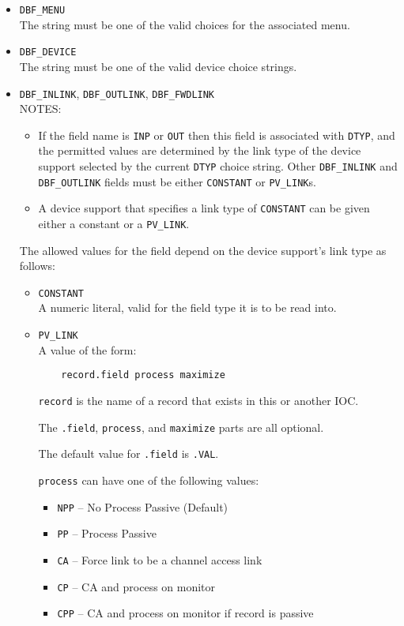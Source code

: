 \begin{description}
\begin{itemize}
\item \verb|DBF_MENU| \\
The string must be one of the valid choices for the associated menu.

\item \verb|DBF_DEVICE| \\
The string must be one of the valid device choice strings.

\item \verb|DBF_INLINK|, \verb|DBF_OUTLINK|, \verb|DBF_FWDLINK| \\
NOTES:

\begin{itemize}
\item If the field name is \verb|INP| or \verb|OUT| then this field is associated with \verb|DTYP|, and the permitted values
are determined by the link type of the device support selected by the current \verb|DTYP| choice string.
Other \verb|DBF_INLINK| and \verb|DBF_OUTLINK| fields must be either \verb|CONSTANT| or \verb|PV_LINK|s.

\item A device support that specifies a link type of \verb|CONSTANT| can be given either a constant or a \verb|PV_LINK|.
\end{itemize}

The allowed values for the field depend on the device support's link type as follows:

\begin{itemize}
\item \verb|CONSTANT| \\
A numeric literal, valid for the field type it is to be read into.

\item \verb|PV_LINK| \\
A value of the form:

\begin{verbatim}
    record.field process maximize
\end{verbatim}

\verb|record| is the name of a record that exists in this or another IOC.

The \verb|.field|, \verb|process|, and \verb|maximize| parts are all optional.

The default value for \verb|.field| is \verb|.VAL|.

\verb|process| can have one of the following values:

\begin{itemize}
\item \verb|NPP| -- No Process Passive (Default)
\item \verb|PP| -- Process Passive
\item \verb|CA| -- Force link to be a channel access link
\item \verb|CP| -- CA and process on monitor
\item \verb|CPP| -- CA and process on monitor if record is passive


\end{itemize}
\end{itemize}
\end{itemize}
\end{description}
